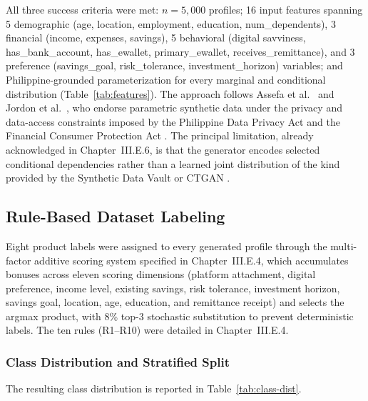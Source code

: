\documentclass[journal]{./IEEE/IEEEtran}
\begin{document}
All three success criteria were met: $n = 5{,}000$ profiles; 16 input features spanning 5 demographic (age, location, employment, education, num\_dependents), 3 financial (income, expenses, savings), 5 behavioral (digital savviness, has\_bank\_account, has\_ewallet, primary\_ewallet, receives\_remittance), and 3 preference (savings\_goal, risk\_tolerance, investment\_horizon) variables; and Philippine-grounded parameterization for every marginal and conditional distribution (Table~\ref{tab:features}). The approach follows Assefa et al.\ \cite{ref46} and Jordon et al.\ \cite{ref83}, who endorse parametric synthetic data under the privacy and data-access constraints imposed by the Philippine Data Privacy Act \cite{ref45} and the Financial Consumer Protection Act \cite{ref44}. The principal limitation, already acknowledged in Chapter~III.E.6, is that the generator encodes selected conditional dependencies rather than a learned joint distribution of the kind provided by the Synthetic Data Vault \cite{ref29} or CTGAN \cite{ref34}.

\subsection{Rule-Based Dataset Labeling}

Eight product labels were assigned to every generated profile through the multi-factor additive scoring system specified in Chapter~III.E.4, which accumulates bonuses across eleven scoring dimensions (platform attachment, digital preference, income level, existing savings, risk tolerance, investment horizon, savings goal, location, age, education, and remittance receipt) and selects the argmax product, with 8\% top-3 stochastic substitution to prevent deterministic labels. The ten rules (R1--R10) were detailed in Chapter~III.E.4.

\subsubsection{Class Distribution and Stratified Split}

The resulting class distribution is reported in Table~\ref{tab:class-dist}.
\end{document}
